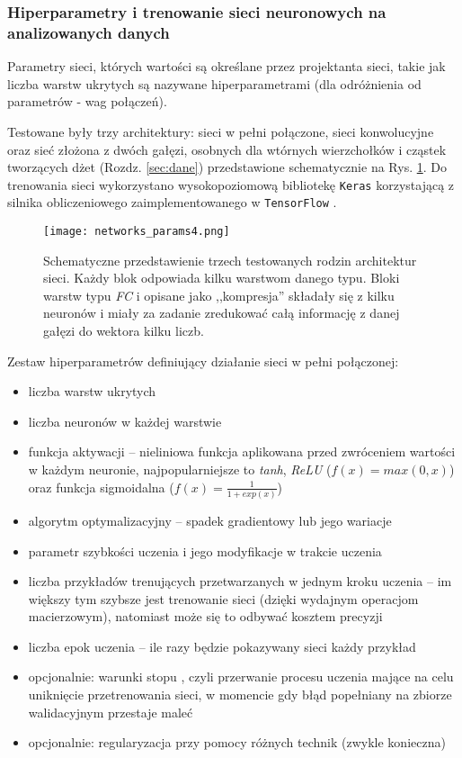 \subsubsection*{Hiperparametry i trenowanie sieci neuronowych na analizowanych danych}

Parametry sieci, których wartości są określane przez projektanta sieci, takie jak liczba warstw ukrytych są nazywane hiperparametrami (dla odróżnienia od parametrów - wag połączeń).

Testowane były trzy architektury: sieci w pełni połączone, sieci konwolucyjne oraz sieć złożona z dwóch gałęzi, osobnych dla wtórnych wierzchołków i cząstek tworzących dżet (Rozdz. \ref{sec:dane}) przedstawione schematycznie na Rys. \ref{fig:nets-params}.
Do trenowania sieci wykorzystano wysokopoziomową bibliotekę \texttt{Keras} \cite{chollet15} korzystającą z silnika obliczeniowego zaimplementowanego w \texttt{TensorFlow} \cite{tensorflow15}.

\begin{figure}[ht]
	\centering
	\texttt{[image: networks\_params4.png]}
	\caption{Schematyczne przedstawienie trzech testowanych rodzin architektur sieci. Każdy blok odpowiada kilku warstwom danego typu. Bloki warstw typu \textit{FC}  i opisane jako ,,kompresja'' składały się z kilku neuronów i miały za zadanie zredukować całą informację z danej gałęzi do wektora kilku liczb.}
	\label{fig:nets-params}
\end{figure}

\clearpage
Zestaw hiperparametrów definiujący działanie sieci w pełni połączonej: 
\begin{itemize}
	\item liczba warstw ukrytych 
	\item liczba neuronów w każdej warstwie
	\item funkcja aktywacji -- nieliniowa funkcja aplikowana przed zwróceniem wartości w każdym neuronie, najpopularniejsze to \textit{tanh}, \textit{ReLU} ($f(x) = max(0,x)$) oraz funkcja sigmoidalna ($f(x) = \frac{1}{1+exp(x)}$)
	\item algorytm optymalizacyjny -- spadek gradientowy lub jego wariacje
	\item parametr szybkości uczenia i jego modyfikacje w trakcie uczenia
	\item liczba przykładów trenujących przetwarzanych w jednym kroku uczenia  -- im większy tym szybsze jest trenowanie sieci (dzięki wydajnym operacjom macierzowym), natomiast może się to odbywać kosztem precyzji
	\item liczba epok uczenia -- ile razy będzie pokazywany sieci każdy przykład
	\item opcjonalnie: warunki stopu , czyli przerwanie procesu uczenia mające na celu uniknięcie przetrenowania sieci, w momencie gdy błąd popełniany na zbiorze walidacyjnym przestaje maleć
	\item opcjonalnie: regularyzacja przy pomocy różnych technik (zwykle konieczna)
\end{itemize}


